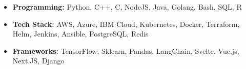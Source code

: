 \begin{itemize}[leftmargin=9pt,label=]
  \item \textbf{Programming:}
    Python, C++, C, NodeJS, Java, Golang, Bash, SQL, R
  \item \textbf{Tech Stack:}
    AWS,
    Azure,
    IBM Cloud,
    Kubernetes,
    Docker,
    Terraform,
    Helm,
    Jenkins,
    Ansible,
    PostgreSQL,
    Redis
  \item \textbf{Frameworks:}
    TensorFlow,
    Sklearn,
    Pandas,
    LangChain,
    Svelte,
    Vue.js,
    Next.JS,
    Django
\end{itemize}

\vspace{0.1cm} \par
